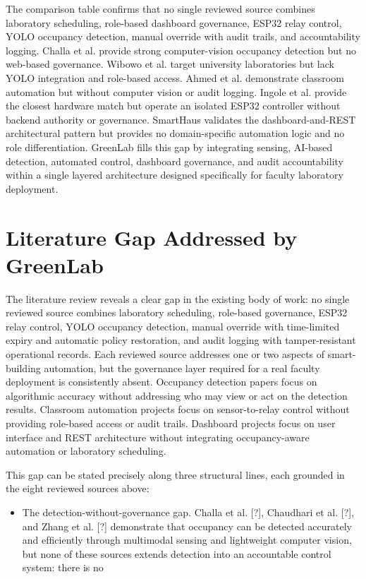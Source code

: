 The comparison table conﬁrms that no single reviewed source combines laboratory
scheduling, role-based dashboard governance, ESP32 relay control, YOLO occupancy detection, manual override with audit trails, and accountability logging. Challa et al. provide
strong computer-vision occupancy detection but no web-based governance. Wibowo et al.
target university laboratories but lack YOLO integration and role-based access. Ahmed et
al. demonstrate classroom automation but without computer vision or audit logging. Ingole et al. provide the closest hardware match but operate an isolated ESP32 controller
without backend authority or governance. SmartHaus validates the dashboard-and-REST
architectural pattern but provides no domain-speciﬁc automation logic and no role differentiation. GreenLab ﬁlls this gap by integrating sensing, AI-based detection, automated
control, dashboard governance, and audit accountability within a single layered architecture designed speciﬁcally for faculty laboratory deployment.



\section{Literature Gap Addressed by GreenLab}


The literature review reveals a clear gap in the existing body of work: no single reviewed
source combines laboratory scheduling, role-based governance, ESP32 relay control, YOLO
occupancy detection, manual override with time-limited expiry and automatic policy restoration, and audit logging with tamper-resistant operational records. Each reviewed source
addresses one or two aspects of smart-building automation, but the governance layer required for a real faculty deployment is consistently absent. Occupancy detection papers
focus on algorithmic accuracy without addressing who may view or act on the detection
results. Classroom automation projects focus on sensor-to-relay control without providing
role-based access or audit trails. Dashboard projects focus on user interface and REST
architecture without integrating occupancy-aware automation or laboratory scheduling.

This gap can be stated precisely along three structural lines, each grounded in the eight
reviewed sources above:


\begin{itemize}
  \item The detection-without-governance gap. Challa et al. [?], Chaudhari et al. [?],
and Zhang et al. [?] demonstrate that occupancy can be detected accurately and
efﬁciently through multimodal sensing and lightweight computer vision, but none
of these sources extends detection into an accountable control system: there is no
\end{itemize}


